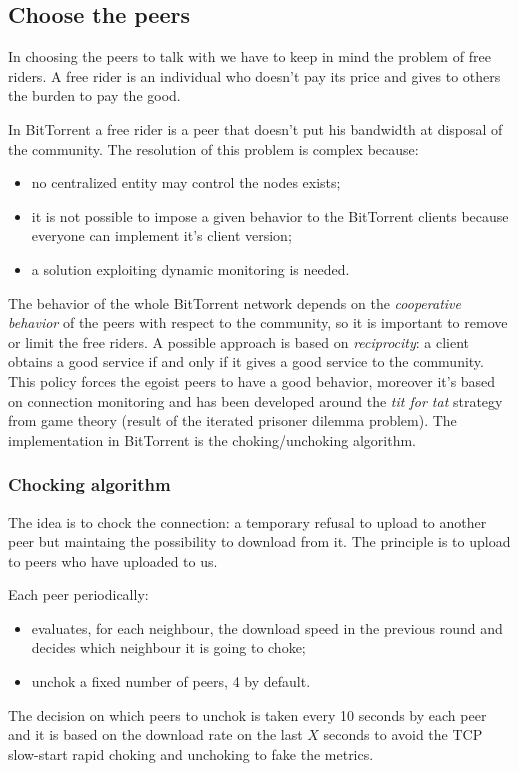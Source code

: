 \subsection{Choose the peers}
In choosing the peers to talk with we have to keep in mind the problem of free riders.
A free rider is an individual who doesn't pay its price and gives to others the burden to pay the good.

In BitTorrent a free rider is a peer that doesn't put his bandwidth at disposal of the community.
The resolution of this problem is complex because:
\begin{itemize}
    \item no centralized entity may control the nodes exists;
    \item it is not possible to impose a given behavior to the BitTorrent clients because everyone can implement it's client version;
    \item a solution exploiting dynamic monitoring is needed.
\end{itemize}

The behavior of the whole BitTorrent network depends on the \emph{cooperative behavior} of the peers with respect to the community, so it is important to remove or limit the free riders.
A possible approach is based on \emph{reciprocity}: a client obtains a good service if and only if it gives a good service to the community.
This policy forces the egoist peers to have a good behavior, moreover it's based on connection monitoring and has been developed around the \emph{tit for tat} strategy from game theory (result of the iterated prisoner dilemma problem).
The implementation in BitTorrent is the choking/unchoking algorithm.

\subsubsection{Chocking algorithm}
The idea is to chock the connection: a temporary refusal to upload to another peer but maintaing the possibility to download from it.
The principle is to upload to peers who have uploaded to us.

Each peer periodically:
\begin{itemize}
    \item evaluates, for each neighbour, the download speed in the previous round and decides which neighbour it is going to choke;
    \item unchok a fixed number of peers, 4 by default.
\end{itemize}
The decision on which peers to unchok is taken every 10 seconds by each peer and it is based on the download rate on the last $X$ seconds to avoid the TCP slow-start rapid choking and unchoking to fake the metrics.

